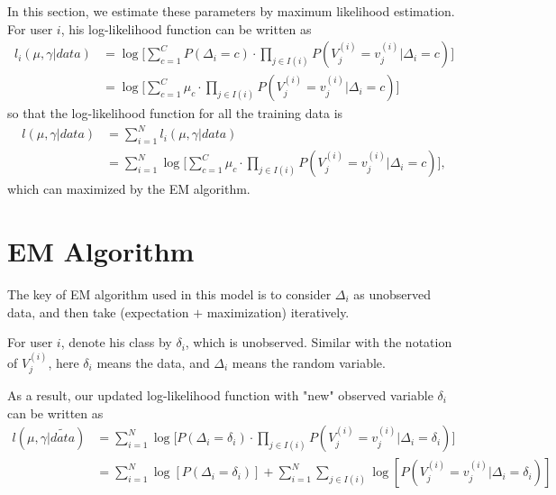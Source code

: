 \documentclass[a4paper,10pt]{article}
\begin{document}
In this section, we estimate these parameters by maximum likelihood estimation. For user $i$, his log-likelihood function can be written as
\begin{equation}
\begin{split}
	l_i(\mu, \gamma | data) &= \log \big[\sum_{c = 1}^{C}P(\Delta_i = c) \cdot \prod_{j \in I(i)} P(V_j^{(i)} = v_j^{(i)} | \Delta_i = c ) \big] \\
	                         &= \log \big[\sum_{c = 1}^{C}\mu_c \cdot \prod_{j \in I(i)} P(V_j^{(i)} = v_j^{(i)} | \Delta_i = c ) \big]
\end{split}
\end{equation}
so that the log-likelihood function for all the training data is
\begin{equation}
\begin{split}
l(\mu, \gamma | data) &= \sum_{i = 1}^{N} l_i(\mu, \gamma | data) \\
                       &= \sum_{i = 1}^{N} \log \big[\sum_{c = 1}^{C}\mu_c \cdot \prod_{j \in I(i)} P(V_j^{(i)} = v_j^{(i)} | \Delta_i = c ) \big],
\end{split}
\end{equation}
which can maximized by the EM algorithm.

\section{EM Algorithm}
The key of EM algorithm used in this model is to consider $\Delta_i$ as unobserved data, and then take (expectation $+$ maximization) iteratively.

For user $i$, denote his class by $\delta_i$, which is unobserved. Similar with the notation of $V_j^{(i)}$, here $\delta_i$ means the data, and $\Delta_i$ means the random variable.

As a result, our updated log-likelihood function with "new" observed variable $\delta_i$ can be written as
\begin{equation}
\begin{split}
l(\mu, \gamma | \tilde{data}) & = \sum_{i = 1}^{N}\log\big[P(\Delta_i = \delta_i)\cdot \prod_{j \in I(i)} P(V_j^{(i)} = v_j^{(i)} | \Delta_i = \delta_i )  \big]\\
                                 &= \sum_{i = 1}^{N} \log[P(\Delta_i = \delta_i)] + \sum_{i = 1}^{N} \sum_{j \in I(i)}\log[P(V_j^{(i)} = v_j^{(i)} | \Delta_i = \delta_i )]
\end{split}
\end{equation} 
\end{document}
